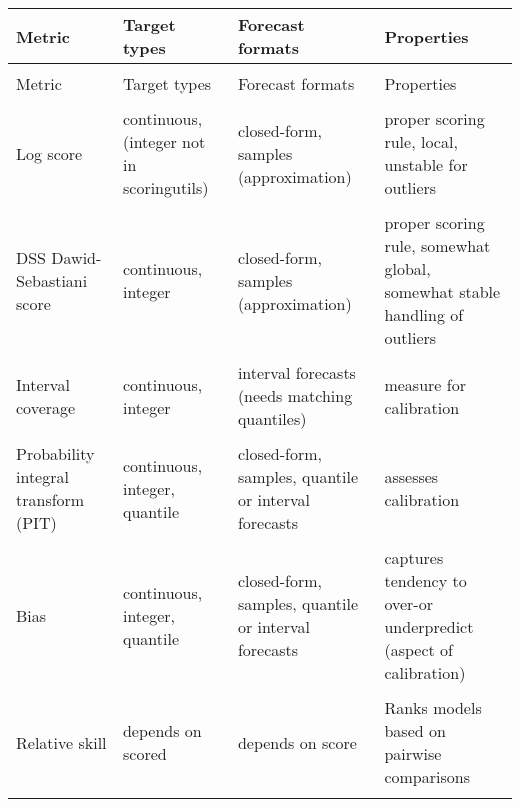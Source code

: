 \documentclass{article}
\begin{document}
\begin{longtable}[t]{>{\raggedright\arraybackslash}p{2.5cm}>{\raggedright\arraybackslash}p{2cm}>{\raggedright\arraybackslash}p{4.5cm}>{\raggedright\arraybackslash}p{4cm}}
\toprule
Metric & Target types & Forecast formats & Properties\\
\midrule
\endfirsthead
\multicolumn{4}{@{}l}{\textit{(continued)}}\\
\toprule
Metric & Target types & Forecast formats & Properties\\
\midrule
\endhead

\endfoot
\bottomrule
\endlastfoot
\cellcolor{gray!6}{CRPS (Continuous) ranked probability score} & \cellcolor{gray!6}{continuous, integer} & \cellcolor{gray!6}{closed-form, samples (approximation)} & \cellcolor{gray!6}{proper scoring rule, global, stable handling of outliers}\\
\addlinespace
Log score & continuous, (integer not in scoringutils) & closed-form, samples (approximation) & proper scoring rule, local, unstable for outliers\\
\addlinespace
\cellcolor{gray!6}{WIS (Weighted) interval score} & \cellcolor{gray!6}{continuous, integer} & \cellcolor{gray!6}{quantile or interval predictions} & \cellcolor{gray!6}{proper scoring rule, global, stable handling of outliers, converges to crps}\\
\addlinespace
DSS Dawid-Sebastiani score & continuous, integer & closed-form, samples (approximation) & proper scoring rule, somewhat global, somewhat stable handling of outliers\\
\addlinespace
\cellcolor{gray!6}{Brier score} & \cellcolor{gray!6}{binary} & \cellcolor{gray!6}{binary probabilities} & \cellcolor{gray!6}{proper scoring rule}\\
\addlinespace
Interval coverage & continuous, integer & interval forecasts (needs matching quantiles) & measure for calibration\\
\addlinespace
\cellcolor{gray!6}{Quantile coverage} & \cellcolor{gray!6}{continuous, integer} & \cellcolor{gray!6}{quantile or interval forecasts} & \cellcolor{gray!6}{measure for calibration}\\
\addlinespace
Probability integral transform (PIT) & continuous, integer, quantile & closed-form, samples, quantile or interval forecasts & assesses calibration\\
\addlinespace
\cellcolor{gray!6}{Sharpness} & \cellcolor{gray!6}{continuous, integer} & \cellcolor{gray!6}{closed-form, samples, quantile or interval forecasts} & \cellcolor{gray!6}{measures sharpness, slightly different depending on forecast format}\\
\addlinespace
Bias & continuous, integer, quantile & closed-form, samples, quantile or interval forecasts & captures tendency to over-or underpredict (aspect of calibration)\\
\addlinespace
\cellcolor{gray!6}{Mean score ratio} & \cellcolor{gray!6}{depends on score} & \cellcolor{gray!6}{depends on score} & \cellcolor{gray!6}{compares performance of two models}\\
\addlinespace
Relative skill & depends on scored & depends on score & Ranks models based on pairwise comparisons\\*
\end{longtable}
\end{document}
